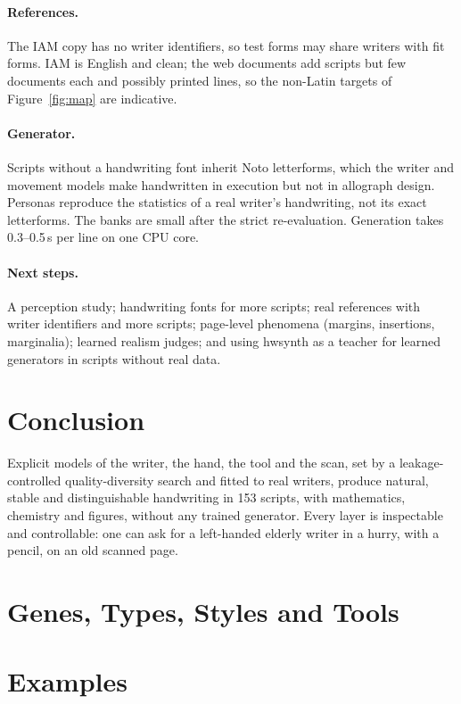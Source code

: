 \documentclass[10pt,twocolumn]{article}
\begin{document}
\paragraph{References.} The IAM copy has no writer identifiers, so test forms may share writers with fit forms.
IAM is English and clean; the web documents add scripts but few documents each and possibly printed lines, so the
non-Latin targets of Figure~\ref{fig:map} are indicative.

\paragraph{Generator.} Scripts without a handwriting font inherit Noto letterforms, which the writer and movement
models make handwritten in execution but not in allograph design. Personas reproduce the statistics of a real
writer's handwriting, not its exact letterforms. The banks are small after the strict re-evaluation. Generation
takes 0.3--0.5\,s per line on one CPU core.

\paragraph{Next steps.} A perception study; handwriting fonts for more scripts; real references with writer
identifiers and more scripts; page-level phenomena (margins, insertions, marginalia); learned realism judges; and
using \textsf{hwsynth} as a teacher for learned generators in scripts without real data.

\section{Conclusion}
\label{sec:conclusion}
Explicit models of the writer, the hand, the tool and the scan, set by a leakage-controlled quality-diversity
search and fitted to real writers, produce natural, stable and distinguishable handwriting in 153 scripts, with
mathematics, chemistry and figures, without any trained generator. Every layer is inspectable and controllable:
one can ask for a left-handed elderly writer in a hurry, with a pencil, on an old scanned page.

{\small}

\appendix
\onecolumn
\section{Genes, Types, Styles and Tools}

\section{Examples}

\end{document}
